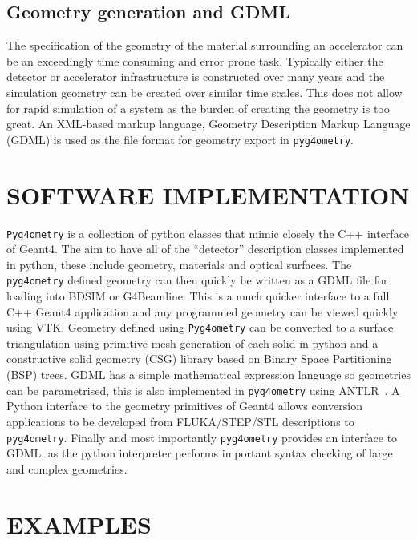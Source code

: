 \documentclass[a4paper,
               keeplastbox,   %
               ]{jacow}
\begin{document}
\subsection{Geometry generation and GDML}
The specification of the geometry of the material surrounding an accelerator can be an exceedingly time consuming and error prone task. Typically either the detector or accelerator infrastructure is constructed over many years and the simulation geometry can be created over similar time scales. This does not allow for rapid simulation of a system as the burden of creating the geometry is too great. An XML-based markup language, Geometry Description Markup Language (GDML) is used as the file format for geometry export in \verb|pyg4ometry|.

\section{SOFTWARE IMPLEMENTATION}
\verb|Pyg4ometry| is a collection of python classes that mimic closely the C++ interface of Geant4. The aim to have all of the ``detector'' description classes implemented in python, these include geometry, materials and optical surfaces. The \verb|pyg4ometry| defined geometry can then quickly be written as a GDML file for loading into BDSIM or G4Beamline. This is a much quicker interface to a full C++ Geant4 application and any programmed geometry can be viewed quickly using VTK. Geometry defined using \verb|Pyg4ometry| can be converted to a surface triangulation using primitive mesh generation of each solid in python and a constructive solid geometry (CSG) library based on Binary Space Partitioning (BSP) trees. GDML has a simple mathematical expression language so geometries can be parametrised, this is also implemented in \verb|pyg4ometry| using ANTLR~\cite{antlr}. A Python interface to the geometry primitives of Geant4 allows conversion applications to be developed from FLUKA/STEP/STL descriptions to \verb|pyg4ometry|. Finally and most importantly \verb|pyg4ometry| provides an interface to GDML, as the python interpreter performs important syntax checking of large and complex geometries. 

\section{EXAMPLES}
\end{document}
